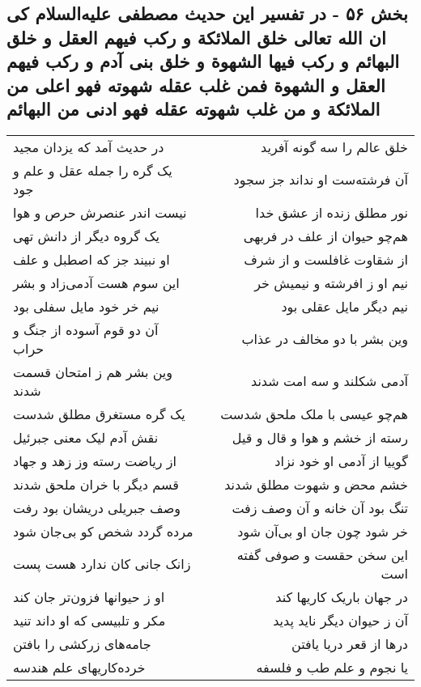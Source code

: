 \begin{center}
\section*{بخش ۵۶ - در تفسیر این حدیث مصطفی علیه‌السلام کی ان الله تعالی خلق الملائکة و رکب  فیهم العقل و خلق البهائم و رکب فیها الشهوة و خلق بنی آدم و رکب فیهم العقل و الشهوة فمن غلب عقله شهوته فهو اعلی من الملائکة و من غلب شهوته عقله فهو ادنی من البهائم}
\label{sec:sh056}
\begin{longtable}{l p{0.5cm} r}
در حدیث آمد که یزدان مجید
&&
خلق عالم را سه گونه آفرید
\\
یک گره را جمله عقل و علم و جود
&&
آن فرشته‌ست او نداند جز سجود
\\
نیست اندر عنصرش حرص و هوا
&&
نور مطلق زنده از عشق خدا
\\
یک گروه دیگر از دانش تهی
&&
هم‌چو حیوان از علف در فربهی
\\
او نبیند جز که اصطبل و علف
&&
از شقاوت غافلست و از شرف
\\
این سوم هست آدمی‌زاد و بشر
&&
نیم او ز افرشته و نیمیش خر
\\
نیم خر خود مایل سفلی بود
&&
نیم دیگر مایل عقلی بود
\\
آن دو قوم آسوده از جنگ و حراب
&&
وین بشر با دو مخالف در عذاب
\\
وین بشر هم ز امتحان قسمت شدند
&&
آدمی شکلند و سه امت شدند
\\
یک گره مستغرق مطلق شدست
&&
هم‌چو عیسی با ملک ملحق شدست
\\
نقش آدم لیک معنی جبرئیل
&&
رسته از خشم و هوا و قال و قیل
\\
از ریاضت رسته وز زهد و جهاد
&&
گوییا از آدمی او خود نزاد
\\
قسم دیگر با خران ملحق شدند
&&
خشم محض و شهوت مطلق شدند
\\
وصف جبریلی دریشان بود رفت
&&
تنگ بود آن خانه و آن وصف زفت
\\
مرده گردد شخص کو بی‌جان شود
&&
خر شود چون جان او بی‌آن شود
\\
زانک جانی کان ندارد هست پست
&&
این سخن حقست و صوفی گفته است
\\
او ز حیوانها فزون‌تر جان کند
&&
در جهان باریک کاریها کند
\\
مکر و تلبیسی که او داند تنید
&&
آن ز حیوان دیگر ناید پدید
\\
جامه‌های زرکشی را بافتن
&&
درها از قعر دریا یافتن
\\
خرده‌کاریهای علم هندسه
&&
یا نجوم و علم طب و فلسفه
\\

\end{longtable}
\end{center}
